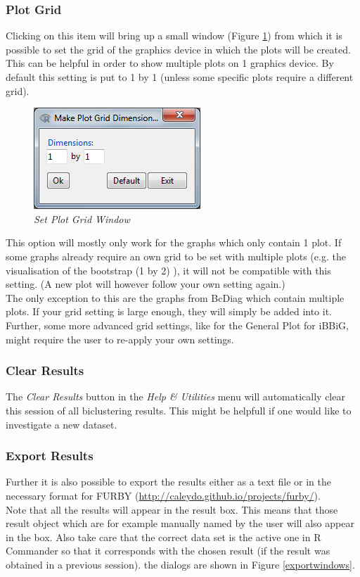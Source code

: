 \documentclass[a4paper]{article}\usepackage[]{graphicx}\usepackage[]{color}
\begin{document}
\subsubsection{Plot Grid}
\noindent Clicking on this item will bring up a small window (Figure
\ref{plotgridwindow}) from which it is possible to set the grid of the graphics
device in which the plots will be created. This can be helpful in order to show
multiple plots on 1 graphics device. By default this setting is put to 1 by 1
(unless some specific plots require a different grid).
\begin{figure}[H]
\centering
\includegraphics[scale=0.5]{figures/plotgridwindow.png}
\caption{{\it Set Plot Grid Window }\label{plotgridwindow}}
\end{figure}

 This option will mostly only work for the graphs which
only contain 1 plot. If some graphs already require an own grid to be set with
multiple plots (e.g. the visualisation of the bootstrap (1 by 2) ), it will not
be compatible with this setting. (A new plot will however follow your own
setting again.)\\
The only exception to this are the graphs from BcDiag which contain multiple
plots. If your grid setting is large enough, they will simply be added into it.
\\
Further, some more advanced grid settings, like for the General Plot for iBBiG,
might require the user to re-apply your own settings.

\subsubsection{Clear Results}
The {\it Clear Results} button in the {\it Help \& Utilities} menu will
automatically clear this session of all biclustering results. This might be
helpfull if one would like to investigate a new dataset.

\subsubsection{Export Results}
Further it is also possible to export the results either as a text file or in
the necessary format for FURBY (\url{http://caleydo.github.io/projects/furby/}). \\
Note that all the results will appear in the result box. This means that those
result object which are for example manually named by the user will also appear
in the box. Also take care that the correct data set is the active one in R
Commander so that it corresponds with the chosen result (if the result was
obtained in a previous session). the dialogs are shown in Figure
\ref{exportwindows}.
\end{document}

